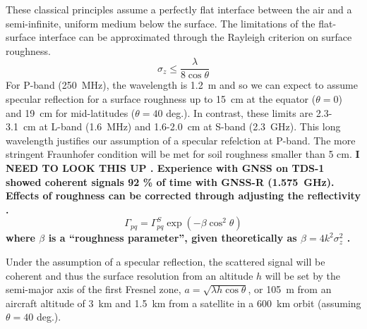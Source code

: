 \documentclass[draftcls,onecolumn]{IEEEtran}  %
\begin{document}
These classical principles assume a perfectly flat interface between the air and a semi-infinite, uniform medium below the surface.
The limitations of the flat-surface interface can be approximated through the Rayleigh criterion on surface roughness. 
\begin{equation} 
  \sigma_z \leq \frac{\lambda}{8 \cos \theta}
     \label{Eq:rayleigh}
 \end{equation}
 For P-band (250~MHz), the wavelength is 1.2~m and so we can expect to assume specular reflection for a surface roughness up to 15~cm at the equator ($\theta = 0$) and 19~cm for mid-latitudes ($\theta = 40$ deg.). 
 In contrast, these limits are 2.3-3.1~cm at L-band (1.6~MHz) and 1.6-2.0~cm at S-band (2.3~GHz). 
 This long wavelength justifies our assumption of a specular refelction at P-band.
The more stringent Fraunhofer condition \cite{Ulaby:1981} will be met for soil roughness smaller than 5 cm. \bf I NEED TO LOOK THIS UP \rm.
  Experience with GNSS on TDS-1 \cite{Chew2016} showed coherent signals 92 \% of time with  GNSS-R (1.575~GHz). 
  Effects of roughness can be corrected through adjusting the reflectivity \cite{beckmann1987scattering}.
 \begin{equation} 
\Gamma_{pq} = \Gamma^S_{pq} \exp \left( - \beta \cos^2 \theta \right)
     \label{Eq:roughness}
 \end{equation}
 where $\beta$ is a ``roughness parameter'', given theoretically as $\beta =4 k^2 \sigma_z^2$ \cite{Choudhury2008}.
 
 Under the assumption of a specular reflection, the scattered signal will be coherent and thus the surface resolution from an altitude $h$ 
 will be set by the semi-major axis of the first Fresnel zone,  $a=\sqrt{\lambda h  \cos \theta}$, or 
 105~m from an aircraft altitude of 3~km and 1.5~km from a satellite in a 600~km orbit (assuming $\theta = 40$ deg.).
\end{document}
